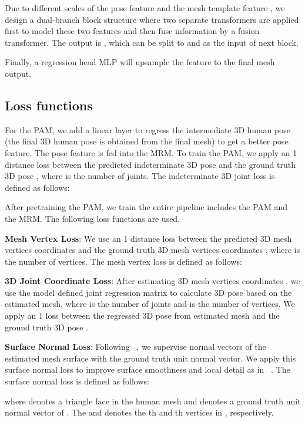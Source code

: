 \documentclass[sigconf]{acmart}
\begin{document}
Due to different scales of the pose feature  and the mesh template feature , we design a dual-branch block structure where two separate transformers are applied first to model these two features and then fuse information by a fusion transformer. The output is , which can be split to  and  as the input of next block.





Finally, a regression head MLP will upsample the feature  to the final mesh output.


\subsection{Loss functions}
For the PAM, we add a linear layer to regress the intermediate 3D human pose (the final 3D human pose is obtained from the final mesh) to get a better pose feature. The pose feature is fed into the MRM. 
To train the PAM, we apply an 1 distance loss between the predicted indeterminate 3D pose  and the ground truth 3D pose , where  is the number of joints. The indeterminate 3D joint loss is defined as follows:


\noindent After pretraining the PAM, we train the entire pipeline includes the PAM and the MRM. The following loss functions are used. 

\textbf{Mesh Vertex Loss}: We use an 1 distance loss between the predicted 3D mesh vertices coordinates  and the ground truth 3D mesh vertices coordinates , where  is the number of vertices. The mesh vertex loss is defined as follows:


\textbf{3D Joint Coordinate Loss}: After estimating 3D mesh vertices coordinates , we use the model defined joint regression matrix  to calculate 3D pose based on the estimated mesh, where  is the number of joints and  is the number of vertices. We apply an 1 loss between the regressed 3D pose from estimated mesh  and the ground truth 3D pose . 


\textbf{Surface Normal Loss}: Following ~\cite{wang2018pixel2mesh,Choi_2020_ECCV_Pose2Mesh}, we supervise normal vectors of the estimated mesh surface with the ground truth unit normal vector. We apply this surface normal loss to improve surface smoothness and local detail as in ~\cite{wang2018pixel2mesh}. The surface normal loss is defined as follows:

where  denotes a triangle face in the human mesh and  denotes a ground truth unit normal vector of . The  and  denotes the th and th vertices in , respectively. 
\end{document}
